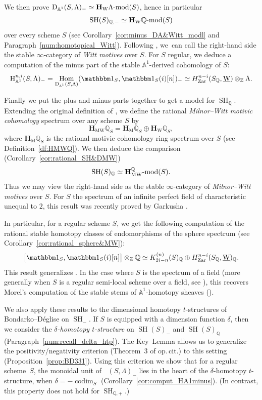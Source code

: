 \documentclass[JEP,XML,SOM,Unicode]{cedram}
\newcommand{\tstructure}{$t$-structure\xspace}
\newcommand{\tstructures}{$t$-structures\xspace}
\newcommand{\modl}[1]{#1\textnormal{-}\mathrm{mod}}
\renewcommand{\AA}{\mathbb A}
\newcommand{\un}{\mathbbm 1}
\newcommand{\uW}{\underline{\mathrm W}}
\newcommand{\HM}{\mathbf H_{\mathrm{M}}}
\newcommand{\HMW}{\mathbf H_{\mathrm{MW}}}
\newcommand{\HW}{\mathbf H_{\mathrm{W}}}
\newcommand{\HA}{\mathrm H_{\AA^1}}
\DeclareMathOperator{\codim}{codim}
\DeclareMathOperator{\SH}{SH}
\DeclareMathOperator{\DA}{D_{\AA^1}}
\DeclareMathOperator{\Hom}{Hom}
\newcommand{\ZZ} {\mathbb Z}
\newcommand{\QQ} {\mathbb Q}
\newcommand{\zar}{\mathrm{Zar}}
\theoremstyle{remark}
\theoremstyle{definition}
\numberwithin{equation}{thm}
\begin{document}
We then prove $\DA(S, \Lambda)_- \simeq \modl{\HW \Lambda}(S)$, hence in particular
\[
\SH(S)_{\QQ,-} \simeq \modl{\HW \QQ}(S)
\]
over every scheme $S$ (see Corollary~\ref{cor:minus_DA&Witt_modl} and Paragraph~\ref{num:homotopical_Witt}).
Following \cite{ALP}, we~can call the right-hand side the stable $\infty$-category of \emph{Witt motives} over $S$.
For $S$ regular, we deduce a computation of the minus part of the stable $\AA^1$-derived cohomology of $S$:
\[
\HA^{n,i}(S,\Lambda)_-
= \Hom_{\DA(S,\Lambda)}(\un_S,\un_S(i)[n])_- \simeq H^{n-i}_\zar(S_\QQ,\uW) \otimes_\ZZ \Lambda.
\]

Finally we put the plus and minus parts together to get a model for $\SH_\QQ$.
Extending the original definition of \cite[Chap.\,6]{BCDFO}, we define the rational \emph{Milnor--Witt motivic cohomology} spectrum over any scheme $S$ by
\[
\HMW \QQ_S=\HM \QQ_S \oplus \HW \QQ_S,
\]
where $\HM \QQ_S$ is the rational motivic cohomology ring spectrum over $S$ (see Definition~\ref{df:HMWQ}).
We then deduce the comparison (Corollary~\ref{cor:rational_SH&DMW})
\[
\SH(S)_{\QQ} \simeq \modl{\HMW^\QQ}(S).
\]
Thus we may view the right-hand side as the stable $\infty$-category of \emph{Milnor--Witt motives} over $S$.
For $S$ the spectrum of an infinite perfect field of characteristic unequal to $2$, this result was recently proved by Garkusha \cite{Garkusha}.

In particular, for a regular scheme $S$, we get the following computation
of the ratio\-nal stable homotopy classes of endomorphisms of the sphere spectrum (see Corollary~\ref{cor:rational_sphere&MW}):
\[
\big[\un_S,\un_S(i)[n]\big] \otimes_\ZZ \QQ \simeq K_{2i-n}^{(n)}(S)_\QQ \oplus H^{n-i}_\zar(S_\QQ,\uW)_\QQ.
\]
This result generalizes \cite[Rem.\,4.5]{ALP}. In the case where $S$ is the spectrum of a field (more generally when $S$ is a regular semi-local scheme over a field, see \cite[Th.\,10.12]{BachmannHoyois}), this recovers Morel's computation of the stable stems of $\mathbb{A}^1$-homotopy sheaves (\cite[Th.\,6.40]{MorelA1}).

We also apply these results to the dimensional homotopy \tstructures of Bondarko--Déglise \cite{BD1} on $\SH_-$.
If $S$ is equipped with a dimension function $\delta$, then we consider the \emph{$\delta$-homotopy \tstructure} on $\SH(S)_-$ and $\SH(S)_\QQ$ (Paragraph~\ref{num:recall_delta_htp}).
The Key~Lemma allows us to generalize the positivity/negativity criterion (Theorem~3 of op.\,cit.) to this setting (Proposition~\ref{prop:BD331}).
Using this criterion we show that for a regular scheme~$S$, the monoidal unit of $\DA(S,\Lambda)_-$ lies in the heart of the $\delta$-homotopy \tstructure, when $\delta=-\codim_S$ (Corollary~\ref{cor:comput_HA1minus}).
(In contrast, this property does not hold for $\SH_{\QQ,+}$.)
\end{document}
